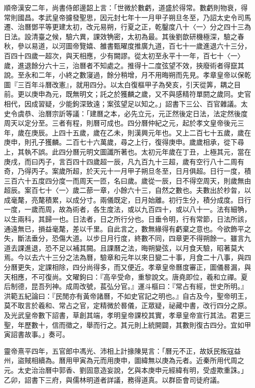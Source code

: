 \begin{pinyinscope}
順帝漢安二年，尚書侍郎邊韶上言：「世微於數虧，道盛於得常。數虧則物衰，得常則國昌。孝武皇帝攄發聖思，因元封七年十一月甲子朔旦冬至，乃詔太史令司馬遷、治曆鄧平等更建太初，改元易朔，行夏之正，乾鑿度八十〈一〉分之四十三為日法。設清臺之候，驗六異，課效觕密，太初為最。其後劉歆研機極深，驗之春秋，參以易道，以河圖帝覽嬉、雒書甄曜度推廣九道，百七十一歲進退六十三分，百四十四歲一超次，與天相應，少有闕謬。從太初至永平十一年，百七十〈一〉歲，進退餘分六十三，治曆者不知處之。推得十二度弦望不效，挾廢術者得竄其說。至永和二年，小終之數寖過，餘分稍增，月不用晦朔而先見。孝章皇帝以保乾圖『三百年斗曆改憲』，就用四分。以太白復樞甲子為癸亥，引天從筭，耦之目前。更以庚申為元，既無明文；託之於獲麟之歲，又不與感精符單閼之歲同。史官相代，因成習疑，少能鉤深致遠；案弦望足以知之。」詔書下三公、百官雜議。太史令虞恭、治曆宗訢等議：「建曆之本，必先立元，元正然後定日法，法定然後度周天以定分至。三者有程，則曆可成也。四分曆仲紀之元，起於孝文皇帝後元三年，歲在庚辰。上四十五歲，歲在乙未，則漢興元年也。又上二百七十五歲，歲在庚申，則孔子獲麟。二百七十六萬歲，尋之上行，復得庚申。歲歲相承，從下尋上，其執不誤。此四分曆元明文圖讖所著也。太初元年歲在丁丑，上極其元，當在庚戌，而曰丙子，言百四十四歲超一辰，凡九百九十三超，歲有空行八十二周有奇，乃得丙子。案歲所超，於天元十一月甲子朔旦冬至，日月俱超。日行一度，積三百六十五度四分度一而周天一匝，名曰歲。歲從一辰，日不得空周天，則歲無由超辰。案百七十〈一〉歲二蔀一章，小餘六十三，自然之數也。夫數出於杪曶，以成毫氂，亮氂積累，以成分寸。兩儀既定，日月始離。初行生分，積分成度。日行一度，一歲而周，故為術者，各生度法，或以九百四十，或以八十一。法有細觕，以生兩科，其歸一也。日法者，日之所行分也。日垂令明，行有常節，日法所該，通遠無已，損益毫氂，差以千里。自此言之，數無緣得有虧棄之意也。今欲飾平之失，斷法垂分，恐傷大道。以步日月行度，終數不同，四章更不得朔餘一。雖言九道去課進退，恐不足以補其闕。且課曆之法，晦朔變弦，以月食天驗，昭著莫大焉。今以去六十三分之法為曆，驗章和元年以來日變二十事，月食二十八事，與四分曆更失，定課相除，四分尚得多，而又便近。孝章皇帝曆度審正，圖儀晷漏，與天相應，不可復尚。文曜鉤曰：『高辛受命，重黎說文。唐堯即位，羲和立禪。夏后制德，昆吾列神。成周改號，萇弘分官。』運斗樞曰：『常占有經，世史所明。』洪範五紀論曰：『民閒亦有黃帝諸曆，不如史官記之明也。』自古及今，聖帝明王，莫不取言於羲和、常占之官，定精微於晷儀，正眾疑，祕藏中書，改行四分之原。及光武皇帝數下詔書，草創其端，孝明皇帝課校其實，孝章皇帝宣行其法。君更三聖，年歷數十，信而徵之，舉而行之。其元則上統開闢，其數則復古四分。宜如甲寅詔書故事。」奏可。

靈帝熹平四年，五官郎中馮光、沛相上計掾陳晃言：「曆元不正，故妖民叛寇益州，盜賊相續為。曆用甲寅為元而用庚申，圖緯無以庚為元者。近秦所用代周之元。太史治治曆中郭香、劉固意造妄說，乞與本庚申元經緯有明，受虛欺重誅。」乙卯，詔書下三府，與儒林明道者詳議，務得道真。以群臣會司徒府議。


\end{pinyinscope}
